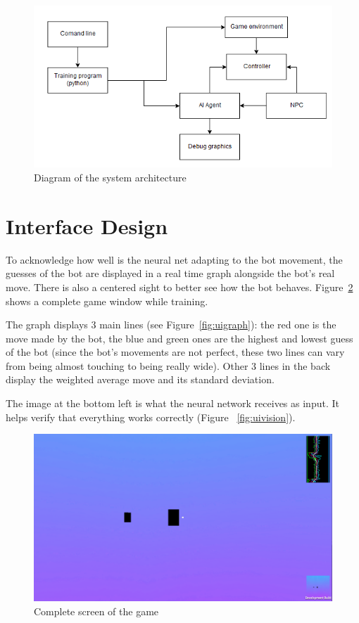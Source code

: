 \begin{figure}[h]
  \centering
		\includegraphics[width=.8\textwidth]{img/systemArchitecture.png}
  \caption{Diagram of the system architecture}
  \label{fig:architecture}
\end{figure}

\section{Interface Design}

To acknowledge how well is the neural net adapting to the bot movement, the guesses of the bot are displayed in a real time graph alongside the bot's real move. There is also a centered sight to better see how the bot behaves. Figure~\ref{fig:uicomp} shows a complete game window while training.

The graph displays 3 main lines (see Figure~\ref{fig:uigraph}): the red one is the move made by the bot, the blue and green ones are the highest and lowest guess of the bot (since the bot's movements are not perfect, these two lines can vary from being almost touching to being really wide). Other 3 lines in the back display the weighted average move and its standard deviation.

The image at the bottom left is what the neural network receives as input. It helps verify that everything works correctly (Figure ~\ref{fig:uivision}).
\begin{figure}[b]
  \centering
		\includegraphics[width=.9\textwidth]{img/uiComplete.png}
  \caption{Complete screen of the game}
  \label{fig:uicomp}
\end{figure}

